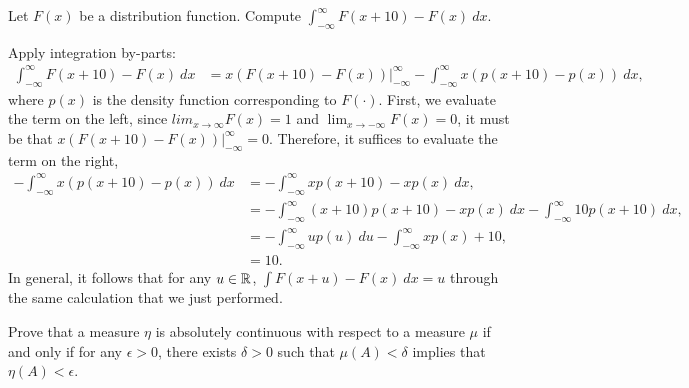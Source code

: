 \begin{problem}{9}
Let $F(x)$ be a distribution function. Compute $\int_{-\infty}^\infty F(x+10) - F(x)~dx$.
\end{problem}
\begin{solution}
    Apply integration by-parts:
    \begin{align*}
        \int_{-\infty}^\infty F(x+10) - F(x)~dx &= x(F(x+10) - F(x)) \Big\vert_{-\infty}^\infty - \int_{-\infty}^\infty x(p(x+10) - p(x))~dx, 
    \end{align*}
    where $p(x)$ is the density function corresponding to $F(\cdot)$. First, we evaluate the term on the left, since $lim_{x\to\infty} F(x) = 1$ and $\lim_{x\to-\infty} F(x) = 0$, it must be that $x(F(x+10) - F(x)) \Big\vert_{-\infty}^\infty = 0$. Therefore, it suffices to evaluate the term on the right, 
    \begin{align*}
        -\int_{-\infty}^\infty x(p(x+10) - p(x))~dx &= -\int_{-\infty}^\infty xp(x+10) - xp(x)~dx, \\
        &= -\int_{-\infty}^\infty (x+10)p(x+10) - xp(x)~dx - \int_{-\infty}^\infty 10p(x+10)~dx, \\
        &= -\int_{-\infty}^\infty up(u)~du - \int_{-\infty}^\infty xp(x) + 10, \\
        &= 10.
    \end{align*}
    In general, it follows that for any $u \in \mathbb{R}$, $\int F(x + u) - F(x)~dx = u$ through the same calculation that we just performed. 
\end{solution}

\begin{problem}{10}
    Prove that a measure $\eta$ is absolutely continuous with respect to a measure $\mu$ if and only if for any $\epsilon > 0$, there exists $\delta > 0$ such that $\mu(A) < \delta$ implies that $\eta(A) < \epsilon$.
\end{problem}
\begin{solution}
\end{solution}

\begin{problem}{11}
\end{problem}
\begin{solution}
\end{solution}

